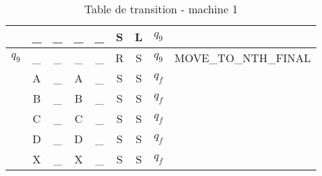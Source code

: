 \begin{table}
\begin{longtable}{| c | c c | c c | c c | c | c |}
         & \_ & \_ & \_ & \_ & S & L & $q_9$ & \\
    \hline
    $q_9$ & \_ & \_ & \_ & \_ & R & S & $q_9$ & MOVE\_TO\_NTH\_FINAL \\
         & A & \_ & A & \_ & S & S & $q_f$ & \\
         & B & \_ & B & \_ & S & S & $q_f$ & \\
         & C & \_ & C & \_ & S & S & $q_f$ & \\
         & D & \_ & D & \_ & S & S & $q_f$ & \\
         & X & \_ & X & \_ & S & S & $q_f$ & \\
    \hline
  \end{longtable}
  \caption{Table de transition - machine 1}
\end{table}
